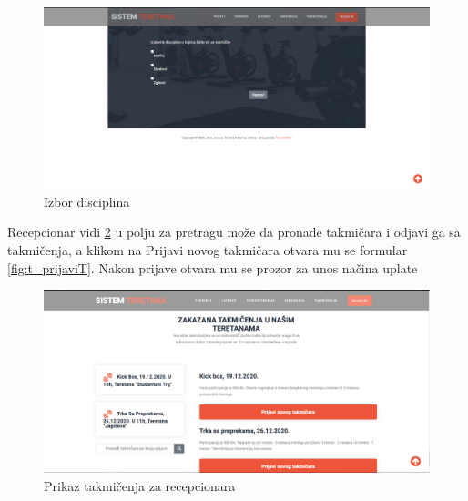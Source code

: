 \documentclass[../main.tex]{subfiles}
\begin{document}
\begin{figure}[!ht]
\begin{center}
\includegraphics[scale=0.35]{sections/korisnicki_interfejs/screenshots/takmicenja_izbor_disciplina.PNG}
\end{center}
\caption{Izbor disciplina}
\label{fig:t_discipline}
\end{figure}

Recepcionar vidi \ref{fig:t_recepcionar} u polju za pretragu može da pronađe takmičara i odjavi ga sa takmičenja, a klikom na Prijavi novog takmičara otvara mu se formular \ref{fig:t_prijaviT}. Nakon prijave otvara mu se prozor za unos načina uplate \

\begin{figure}[!ht]
\begin{center}
\includegraphics[scale=0.35]{sections/korisnicki_interfejs/screenshots/takmicenja_recepcionar.PNG}
\end{center}
\caption{Prikaz takmičenja za recepcionara}
\label{fig:t_recepcionar}
\end{figure}
\end{document}
